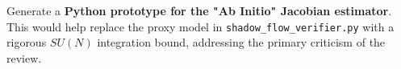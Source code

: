 \begin{mdframed}[style=info, frametitle={Next Step}]
Generate a \textbf{Python prototype for the "Ab Initio" Jacobian estimator}. This would help replace the proxy model in \texttt{shadow\_flow\_verifier.py} with a rigorous $SU(N)$ integration bound, addressing the primary criticism of the review.
\end{mdframed}






